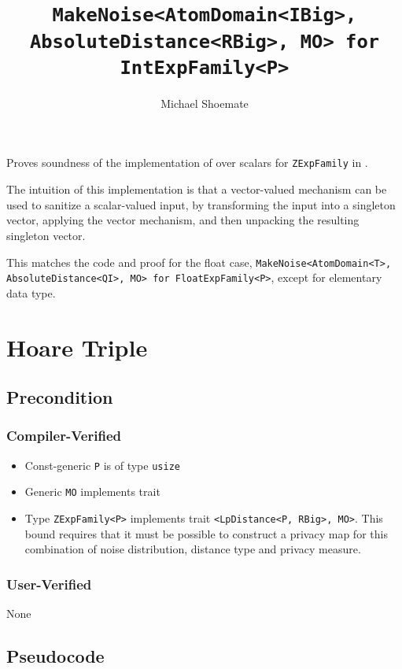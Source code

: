 \documentclass{article}
\title{\texttt{MakeNoise<AtomDomain<IBig>, AbsoluteDistance<RBig>, MO> for IntExpFamily<P>}}
\author{Michael Shoemate}
\date{}
\begin{document}
\maketitle

\contrib
Proves soundness of the implementation of  over scalars
for \texttt{ZExpFamily} in .

The intuition of this implementation is that a vector-valued mechanism can be used to sanitize a scalar-valued input,
by transforming the input into a singleton vector, 
applying the vector mechanism, and then unpacking the resulting singleton vector.

This matches the code and proof for the float case, \texttt{MakeNoise<AtomDomain<T>, AbsoluteDistance<QI>, MO> for FloatExpFamily<P>},
except for elementary data type.

\section{Hoare Triple}
\subsection*{Precondition}
\subsubsection*{Compiler-Verified}

\begin{itemize}
    \item Const-generic \texttt{P} is of type \texttt{usize}
    \item Generic \texttt{MO} implements trait 
    \item Type \texttt{ZExpFamily<P>} implements trait \texttt{<LpDistance<P, RBig>, MO>}.
        This bound requires that it must be possible to construct a privacy map for this combination of noise distribution, distance type and privacy measure.
\end{itemize}

\subsubsection*{User-Verified}
None

\subsection*{Pseudocode}

\end{document}
